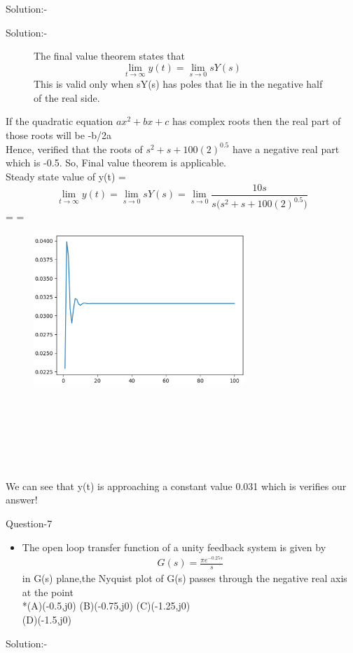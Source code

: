 \documentclass[journal,12pt,twocolumn]{IEEEtran}
\begin{document}
\begin{frame}{Solution:- }
\begin{frame}{Solution:- }
\begin{figure}[htp]
    The final value theorem states that  \[ \lim_{t \to \infty} y(t) = \lim_{s \to 0} sY(s)\]
\newline This is valid only when sY(s) has poles that lie in the negative half of the real side.
\end{figure}
 
  If the quadratic equation $ax^2 + bx + c$ has complex roots then the real part of those roots will be -b/2a
\\  
  Hence, verified that the roots of $s^2+ s + 100{(2)^{0.5}}$ have a negative real part which is -0.5. So, Final value theorem is applicable.
\\
 Steady state value of y(t) = \[ \lim_{t \to \infty} y(t) = \lim_{s \to 0} sY(s) = \lim_{s \to 0} \dfrac{10s}{s(s^2+ s + 100{(2)^{0.5})}} \]   
 \centering
 =  =  
\end{frame}
\begin{frame}{}
\begin{figure}
    \includegraphics[width=8cm]{./figs/shru1.eps}
\end{figure}
\\\\\\\\\\\\
We can see that y(t) is approaching a constant value 0.031 which is verifies our answer!    
\end{frame} 

\begin{frame}{Question-7 }
\begin{itemize}
\item The open loop transfer function of a unity feedback system is given by
\begin{align*}
 G(s)=\frac{\pi e^{-0.25s}}{s}
\end{align*}
in G(s) plane,the Nyquist plot of G(s) passes through the negative real axis at the point
\\*(A)(-0.5,j0)  (B)(-0.75,j0)  (C)(-1.25,j0) \\ (D)(-1.5,j0)
\end{itemize}
\end{frame}
\begin{frame}{Solution:- }
\begin{itemize}



\end{itemize}
\end{frame}
\end{frame}
\end{document}
